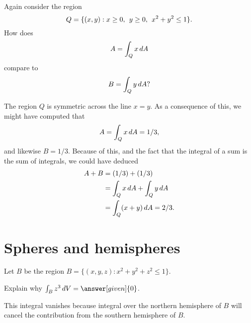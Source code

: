 \documentclass{ximera}
\begin{document}
\begin{question}
  Again consider the region
  \[
    Q = \{ (x,y)  : x \geq 0,\hspace{1ex} y \geq 0,\hspace{1ex} x^2 + y^2 \leq 1 \}.
  \]
  How does
  \[
    A = \int_Q x \mathop{}\!d A  
  \]
  compare to 
  \[
    B = \int_Q y \mathop{}\!d A?
  \]

  \begin{multipleChoice}
  \end{multipleChoice}
  
  \begin{feedback}[correct]
    The region $Q$ is symmetric across the line $x = y$.  As a
    consequence of this, we might have computed that
    \[
    A = \int_Q x \mathop{}\!d A = 1/3,
    \]
    and likewise $B = 1/3$.  Because of this, and the fact that the
    integral of a sum is the sum of integrals, we could have deduced
    \begin{align*}
      A + B &= (1/3) + (1/3) \\
      &= \int_Q x \mathop{}\!d A + \int_Q y \mathop{}\!d A \\
      &= \int_Q (x+y) \mathop{}\!d A = 2/3.
    \end{align*}
  \end{feedback}
\end{question}

\section{Spheres and hemispheres}

\begin{example}
  Let $B$ be the region $B = \{ (x,y,z)  : x^2 + y^2 + z^2 \leq 1\}$.
  
  Explain why $\int_B z^3 \d V = \answer[given]{0}$.
  
  \begin{explanation}
    This integral vanishes because integral over the northern
    hemisphere of $B$ will cancel the contribution from the southern
    hemisphere of $B$.
  \end{explanation}
\end{example}
\end{document}
